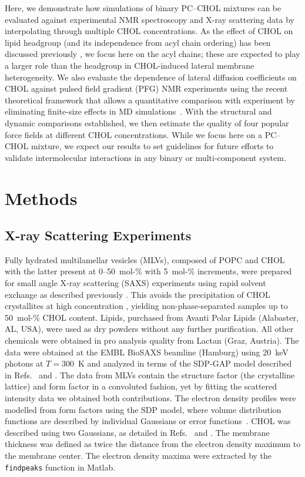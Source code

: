 \documentclass[journal=jctcce]{achemso}
\begin{document}
Here, we demonstrate how simulations of binary PC--CHOL mixtures can be evaluated against experimental NMR spectroscopy and X-ray scattering data by interpolating through multiple CHOL concentrations. As the effect of CHOL on lipid headgroup (and its independence from acyl chain ordering) has been discussed previously \cite{botan15,antila22b}, we focus here on the acyl chains; these are expected to play a larger role than the headgroup in CHOL-induced lateral membrane heterogeneity. We also evaluate the dependence of lateral diffusion coefficients on CHOL against pulsed field gradient (PFG) NMR experiments \cite{filippov2003effect,filippov2003influence} using the recent theoretical framework that allows a quantitative comparison with experiment by eliminating finite-size effects in MD simulations~\cite{vogele2016divergent,vogele2018hydrodynamics}. With the structural and dynamic comparisons established, we then estimate the quality of four popular force fields at different CHOL concentrations. While we focus here on a PC--CHOL mixture, we expect our results to set guidelines for future efforts to validate intermolecular interactions in any binary or multi-component system. 

\section{Methods}

\subsection{X-ray Scattering Experiments}

Fully hydrated multilamellar vesicles (MLVs), composed of POPC and CHOL with the latter present at 0--50~mol-\% with 5~mol-\% increments, were prepared for small angle X-ray scattering (SAXS) experiments using rapid solvent exchange as described previously \cite{rieder2015optimizing,belivcka2017high}. This avoids the precipitation of CHOL crystallites at high concentration \cite{buboltz1999novel}, yielding non-phase-separated samples up to 50~mol-\% CHOL content. Lipids, purchased from Avanti Polar Lipids (Alabaster, AL, USA), were used as dry powders without any further purification. All other chemicals were obtained in pro analysis quality from Lactan (Graz, Austria). The data were obtained at the EMBL BioSAXS beamline (Hamburg) using 20~keV photons at $T=300$~K and analyzed in terms of the SDP-GAP model described in Refs.~ and . The data from MLVs contain the structure factor (the crystalline lattice) and form factor in a convoluted fashion, yet by fitting the scattered intensity data we obtained both contributions. The electron density profiles were modelled from form factors using the SDP model, where volume distribution functions are described by individual Gaussians or error functions~\cite{heberle12,Kucerka08a,kucerka12}. CHOL was described using two Gaussians, as detailed in Refs.~ and . The membrane thickness was defined as twice the distance from the electron density maximum to the membrane center. The electron density maxima were extracted by the \texttt{findpeaks} function in Matlab.
\end{document}
